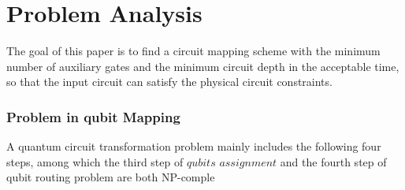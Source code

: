 \documentclass[runningheads]{llncs}
\begin{document}
\section{Problem Analysis}
\label{Problem Analysis}
The goal of this paper is to find a circuit mapping scheme with the minimum number of auxiliary gates 
and the minimum circuit depth in the acceptable time, 
so that the input circuit can satisfy the physical circuit constraints.
\subsubsection{Problem in qubit Mapping}
A quantum circuit transformation problem mainly includes the following four steps, 
among which the third step of $qubits$ $assignment$ and the fourth step of qubit routing 
problem are both NP-comple\cite{2018QubitSiraichi}
\end{document}
